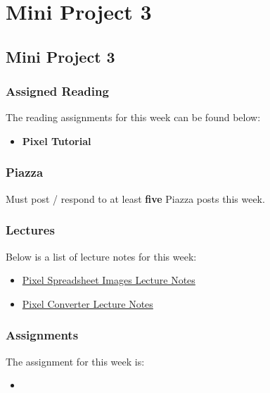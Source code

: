 \clearpage

\renewcommand{\ChapTitle}{Mini Project 3}
\renewcommand{\SectionTitle}{Mini Project 3}

\chapter{\ChapTitle}
\section{\SectionTitle}

\subsection{Assigned Reading}

The reading assignments for this week can be found below:

\begin{itemize}
    \item \textbf{Pixel Tutorial}
\end{itemize}

\subsection{Piazza}

Must post / respond to at least \textbf{five} Piazza posts this week.

\subsection{Lectures}

\noindent Below is a list of lecture notes for this week:

\begin{itemize}
    \item \href{https://drive.google.com/drive/u/2/folders/1l_JWvAp1gkHM8J09HDKTnmJ_2JoEXgG7}{Pixel Spreadsheet Images Lecture Notes}
    \item \href{https://think-maths.co.uk/spreadsheet/}{Pixel Converter Lecture Notes}
\end{itemize}

\subsection{Assignments}

The assignment for this week is:

\begin{itemize}
    \item {}
\end{itemize}